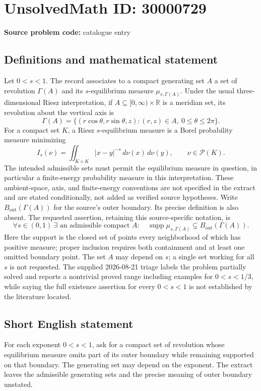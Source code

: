 \documentclass[11pt]{article}
\newcommand{\R}{\mathbb{R}}
\begin{document}
\section*{UnsolvedMath ID: 30000729}
\textbf{Source problem code:} catalogue entry
\subsection{Definitions and mathematical statement}
Let $0<s<1$. The record associates to a compact generating set $A$ a set of revolution $\Gamma(A)$ and its $s$-equilibrium measure $\mu_{s,\Gamma(A)}$. Under the usual three-dimensional Riesz interpretation, if $A\subseteq[0,\infty)\times\R$ is a meridian set, its revolution about the vertical axis is \[\Gamma(A)=\{(r\cos\theta,r\sin\theta,z):(r,z)\in A,\ 0\leq\theta\leq2\pi\}.\] For a compact set $K$, a Riesz $s$-equilibrium measure is a Borel probability measure minimizing \[I_s(\nu)=\iint_{K\times K}|x-y|^{-s}\,d\nu(x)\,d\nu(y),\qquad \nu\in\mathcal P(K).\] The intended admissible sets must permit the equilibrium measure in question, in particular a finite-energy probability measure in this interpretation. These ambient-space, axis, and finite-energy conventions are not specified in the extract and are stated conditionally, not added as verified source hypotheses. Write $B_{\mathrm{out}}(\Gamma(A))$ for the source's outer boundary. Its precise definition is also absent. The requested assertion, retaining this source-specific notation, is \[\forall s\in(0,1)\ \exists\text{ an admissible compact }A:\quad \operatorname{supp}\mu_{s,\Gamma(A)}\subsetneq B_{\mathrm{out}}(\Gamma(A)).\] Here the support is the closed set of points every neighborhood of which has positive measure; proper inclusion requires both containment and at least one omitted boundary point. The set $A$ may depend on $s$; a single set working for all $s$ is not requested. The supplied 2026-08-21 triage labels the problem partially solved and reports a nontrivial proved range including examples for $0<s<1/3$, while saying the full existence assertion for every $0<s<1$ is not established by the literature located.
\subsection{Short English statement}
For each exponent $0<s<1$, ask for a compact set of revolution whose equilibrium measure omits part of its outer boundary while remaining supported on that boundary. The generating set may depend on the exponent. The extract leaves the admissible generating sets and the precise meaning of outer boundary unstated.
\end{document}
